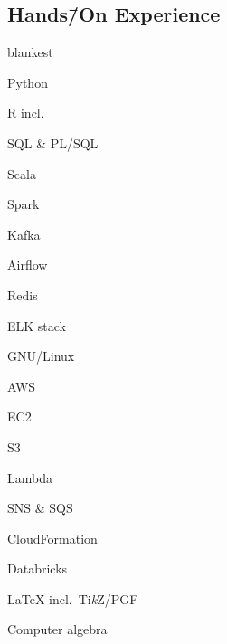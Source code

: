 \documentclass[%
version=last,%
fontsize=11pt,%
paper=A4,%
headinclude=false,%
footinclude=false,%
headlines=0,%
footlines=0,%
areasetadvanced,%
toc=bibnumbered,%
]{scrartcl}%
\begin{document}
\begin{minipage}[t]{.4\textwidth}
  \subsection{%
    \texorpdfstring%
    {Hands\=/On Experience}%
    {Hands-On Experience}%
  }%
  \label{sec:hands-on-experience}

  \begin{UniformTCBRaster}{2}
    \begin{tcboxedraster}[raster columns=1]{blankest}
      \begin{TCBItems}
      \item Python
      \item R incl.\ 
      \item SQL \& PL/SQL
      \item Scala
      \end{TCBItems}
      \begin{tcolorbox}
        \begin{minipage}[t]{0.45\linewidth}
          \begin{citemize}
          \item Spark
          \item Kafka
          \item Airflow
          \end{citemize}
        \end{minipage}%
        \hfill%
        \begin{minipage}[t]{0.55\linewidth}
          \begin{citemize}
          \item Redis
          \item ELK stack
          \end{citemize}          
        \end{minipage}
      \end{tcolorbox}
    \end{tcboxedraster}
    \begin{TCBItems}
    \item GNU/Linux
    \item AWS
      \begin{citemize}
      \item EC2
      \item S3
      \item Lambda
      \item SNS \& SQS
      \item CloudFormation
      \end{citemize}
    \item Databricks
    \end{TCBItems}
    \begin{tcolorbox}
      \LaTeX{} incl.\ Ti\emph{k}Z/PGF
    \end{tcolorbox}
    \begin{tcolorbox}
      Computer algebra
    \end{tcolorbox}
  \end{UniformTCBRaster}


\end{minipage}
\end{document}

